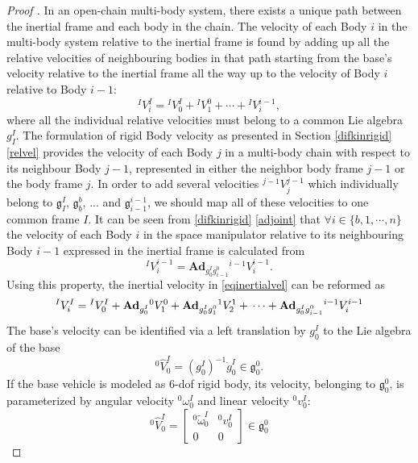 \documentclass[lettersize,journal]{IEEEtran}
\def \g  {\mathfrak{g}}
\def \Ad {\textbf{Ad}}
\begin{document}
\begin{proof}[Proof ] In an open-chain multi-body system, there exists a unique path between the inertial frame and each body in the chain. The velocity of each Body $i$ in the multi-body system relative to the inertial frame is found by adding up all the relative velocities of neighbouring bodies in that path starting from the base's velocity relative to the inertial frame all the way up to the velocity of Body $i$ relative to Body $i-1$:
\begin{equation}
    ^IV^I_i={}^IV_{0}^I+{}^IV_{1}^{0}+\cdots+{}^IV_{i}^{i-1}, \label{eqinertialvel}
\end{equation}
where all the individual relative velocities must belong to a common Lie algebra $g^I_I$.
The formulation of rigid Body velocity as presented in Section \ref{difkinrigid} \eqref{relvel} provides the velocity of each Body $j$ in a multi-body chain with respect to its neighbour Body $j-1$, represented in either the neighbor body frame $j-1$ or the body frame $j$. In order to add several velocities $^{j-1}V^{j-1}_j$ which individually belong to $\g^I_I$, $\g^b_b$, ... and $\g^{i-1}_{i-1}$, we should map all of these velocities to one common frame $I$.
It can be seen from \ref{difkinrigid} \eqref{adjoint} that $\forall i\in\{b,1,\cdots,n\}$ the velocity of each Body $i$ in the space manipulator relative to its neighbouring Body $i-1$ expressed in the inertial frame is calculated from 
\begin{equation}
    {}^{I}V_i^{i-1}=\Ad_{g^{I}_0 g_{i-1}^0}{}^{i-1}V_i^{i-1}.
\end{equation}
Using this property, the inertial velocity in \eqref{eqinertialvel} can be reformed as
\begin{equation}
    {}^IV^I_i={}^IV_{0}^I+\Ad_{g^I_0}{}^0V_{1}^{0}+\Ad_{g^I_0g^0_1}{}^1V_{2}^{1}+\\
    \cdots+\Ad_{g^I_0g^0_{i-1}}{}^{i-1}V_{i}^{i-1}
\end{equation}
The base's velocity can be identified via a left translation by $g^I_0$ to the Lie algebra of the base
\begin{equation}
    ^0\hat{V}_0^I=({g_0^I})^{-1}\dot{g}_0^I \in \g^0_0.
\end{equation}
If the base vehicle is modeled as 6-dof rigid body, its velocity, belonging to $\g^0_0$, is parameterized by angular velocity $^0\omega^I_0$ and linear velocity $^0v^I_0$:
\begin{equation}
    ^0\hat{V}_0^I=\begin{bmatrix}{}^0\tilde{\omega}_0^I&^0v^I_0\\0 & 0\end{bmatrix} \in \g^0_0

\end{equation}
\end{proof}
\end{document}
